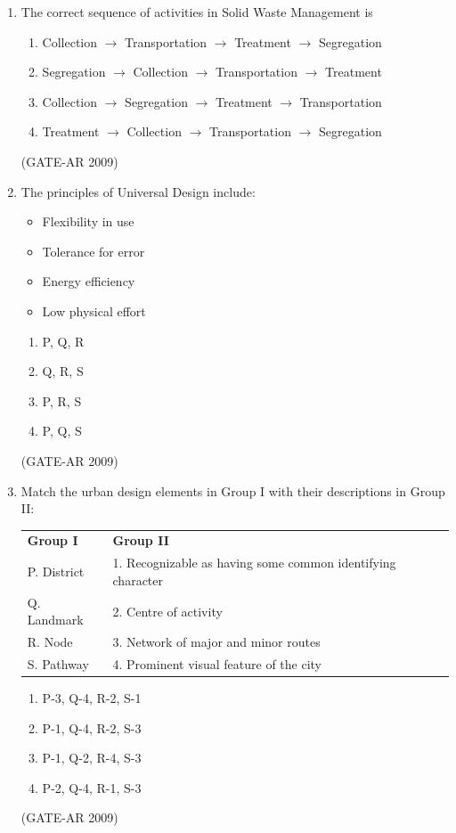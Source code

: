 \documentclass[a4paper,10pt]{article}
\begin{document}
\begin{enumerate}
	\item The correct sequence of activities in Solid Waste Management is 
    \begin{enumerate}
        \item Collection $\to$ Transportation $\to$ Treatment $\to$ Segregation
        \item Segregation $\to$ Collection $\to$ Transportation $\to$ Treatment
        \item Collection $\to$ Segregation $\to$ Treatment $\to$ Transportation
        \item Treatment $\to$ Collection $\to$ Transportation $\to$ Segregation
    \end{enumerate}
    \hfill (GATE-AR 2009)
    
    \item The principles of Universal Design include: 
    \begin{itemize}
        \item Flexibility in use
        \item Tolerance for error
        \item Energy efficiency
        \item Low physical effort
    \end{itemize}
    \begin{multicols}{4}
	\begin{enumerate}
        \item P, Q, R
        \item Q, R, S
        \item P, R, S
        \item P, Q, S
    \end{enumerate}
	\end{multicols}
    \hfill (GATE-AR 2009)
    
    \item Match the urban design elements in Group I with their descriptions in Group II:  \\
    \begin{tabular}{ l l }
	\textbf{Group I} & \textbf{Group II} \\
	P. District & 1. Recognizable as having some common identifying character \\
	Q. Landmark & 2. Centre of activity \\
	R. Node & 3. Network of major and minor routes \\
	S. Pathway & 4. Prominent visual feature of the city \\
	\end{tabular}
	\begin{multicols}{2}
	\begin{enumerate}
        \item P-3, Q-4, R-2, S-1
        \item P-1, Q-4, R-2, S-3
        \item P-1, Q-2, R-4, S-3
        \item P-2, Q-4, R-1, S-3
    \end{enumerate}
	\end{multicols}
    \hfill (GATE-AR 2009)


\end{enumerate}
\end{document}
